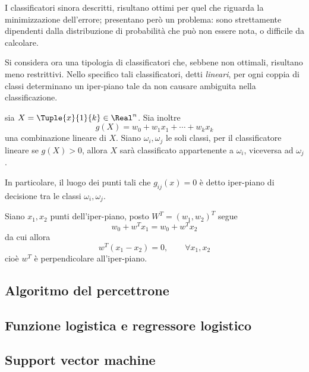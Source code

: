 \documentclass{subfiles}
\begin{document}
I classificatori sinora descritti, risultano ottimi per quel che riguarda la minimizzazione dell'errore;
presentano però un problema: sono strettamente dipendenti dalla distribuzione di probabilità che può non essere nota,
o difficile da calcolare.

Si considera ora una tipologia di classificatori che, sebbene non ottimali\footnotemark[1], risultano meno restrittivi.
Nello specifico tali classificatori, detti \emph{lineari}, per ogni coppia di classi determinano un iper-piano tale da non causare ambiguita nella classificazione.
\begin{Definition*}
    sia \(X = \Tuple{x}{1}{k} \in \Real^{n}\). Sia inoltre
    \[
        g(X) = w_{0} + w_{1}x_{1} + \cdots + w_{k}x_{k}
    \]
    una combinazione lineare di \(X\).
    Siano \(\omega_{i}, \omega_{j}\) le soli classi, per il classificatore lineare se \(g(X) > 0\), allora \(X\) sarà classificato appartenente a \(\omega_{i}\),
    viceversa ad \(\omega_{j}\).
\end{Definition*}

\noindent In particolare, il luogo dei punti tali che \(g_{ij}(x) = 0\) è detto iper-piano di decisione tra le classi \(\omega_{i}, \omega_{j}\).

Siano \(x_{1}, x_{2}\) punti dell'iper-piano, posto \(W^{T} = (w_{1}, w_{2})^{T}\) segue
\[
    w_{0} + w^{T} x_{1} = w_{0} + w^{T}x_{2}
\]
da cui allora
\[
    w^{T}(x_{1} - x_{2}) = 0, \qquad \forall x_{1}, x_{2}
\]
cioè \(w^{T}\) è perpendicolare all'iper-piano.

\subsection{Algoritmo del percettrone}


\subsection{Funzione logistica e regressore logistico}


\subsection{Support vector machine}

\end{document}
